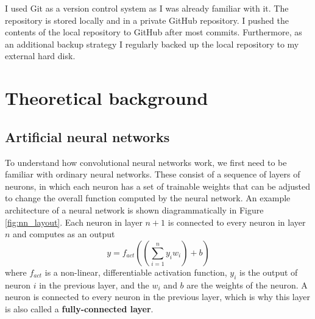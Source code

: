 \documentclass[12pt,a4paper,twoside,openright]{report}
\begin{document}
I used Git as a version control system as I was already familiar with it. The repository is stored locally and in a private GitHub repository. I pushed the contents of the local repository to GitHub after most commits. Furthermore, as an additional backup strategy I regularly backed up the local repository to my external hard disk.

\section{Theoretical background}
\subsection{Artificial neural networks}
To understand how convolutional neural networks work, we first need to be familiar with ordinary neural networks. These consist of a sequence of layers of neurons, in which each neuron has a set of trainable weights that can be adjusted to change the overall function computed by the neural network. An example architecture of a neural network is shown diagrammatically in Figure \ref{fig:nn_layout}. Each neuron in layer $n+1$ is connected to every neuron in layer $n$ and computes as an output
\begin{equation}
y = f_{act}((\sum_{i=1}^{n} y_i w_i) + b)	
\end{equation}
where $f_{act}$ is a non-linear, differentiable activation function, $y_i$ is the output of neuron $i$ in the previous layer, and the $w_i$ and $b$ are the weights of the neuron. A neuron is connected to every neuron in the previous layer, which is why this layer is also called a \textbf{fully-connected layer}.
\end{document}

